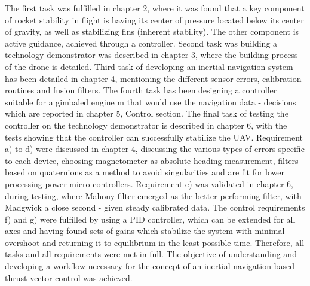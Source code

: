 The first task was fulfilled in chapter 2, where it was found that a key component of rocket stability in flight is having its center of pressure located below its center of gravity, as well as stabilizing fins (inherent stability). The other component is active guidance, achieved through a controller. 
Second task was building a technology demonstrator was described in chapter 3, where the building process of the drone is detailed. Third task of developing an inertial navigation system has been detailed in chapter 4, mentioning the different sensor errors, calibration routines and fusion filters. The fourth task has been designing a controller suitable for a gimbaled engine m that would use the navigation data - decisions which are reported in chapter 5, Control section. 
The final task of testing the controller on the technology demonstrator is described in chapter 6, with the tests showing that the controller can successfully stabilize the UAV. 
Requirement a) to d) were discussed in chapter 4, discussing the various types of errors specific to each device, choosing magnetometer as absolute heading measurement, filters based on quaternions as a method to avoid singularities and are fit for lower processing power micro-controllers. 
Requirement e) was validated in chapter 6, during testing, where Mahony filter emerged as the better performing filter, with Madgwick a close second - given steady calibrated data. 
The control requirements f) and g) were fulfilled by using a PID controller, which can be extended for all axes and having found sets of gains which stabilize the system with minimal overshoot and returning it to equilibrium in the least possible time. 
Therefore, all tasks and all requirements were met in full. The objective of understanding and developing a workflow necessary for the concept of an inertial navigation based thrust vector control was achieved.

